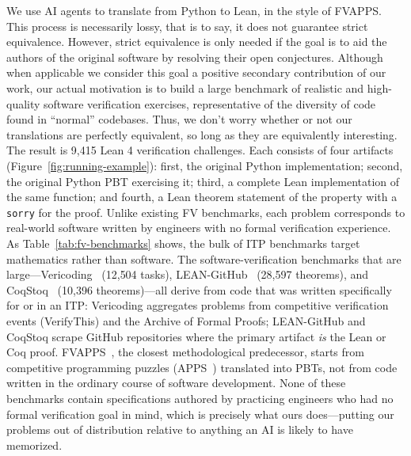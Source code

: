 We use AI agents to translate from Python to Lean, in the style of FVAPPS.
This process is necessarily lossy, that is to say, it does not guarantee strict equivalence.
However, strict equivalence is only needed if the goal is to aid the authors of the original
software by resolving their open conjectures.
Although when applicable we consider this goal a positive secondary contribution of our work,
our actual motivation is to build a large benchmark of realistic and high-quality
software verification exercises, representative of the diversity of code found in 
``normal'' codebases.
Thus, we don't worry whether or not our translations are perfectly equivalent, so long as they are equivalently interesting.
The result is 9{,}415 Lean 4 verification challenges. Each consists of four artifacts (Figure~\ref{fig:running-example}): first, the original Python implementation; second, the original Python PBT exercising it; third, a complete Lean implementation of the same function; and fourth, a Lean theorem statement of the property with a \texttt{sorry} for the proof. Unlike existing FV benchmarks, each problem corresponds to real-world software written by engineers with no formal verification experience. As Table~\ref{tab:fv-benchmarks} shows, the bulk of ITP benchmarks target mathematics rather than software. The software-verification benchmarks that are large---Vericoding~\cite{bursuc2025benchmark} (12{,}504 tasks), LEAN-GitHub~\cite{wu2024lean} (28{,}597 theorems), and CoqStoq~\cite{thompson2024rango} (10{,}396 theorems)---all derive from code that was written specifically for or in an ITP: Vericoding aggregates problems from competitive verification events (VerifyThis) and the Archive of Formal Proofs; LEAN-GitHub and CoqStoq scrape GitHub repositories where the primary artifact \emph{is} the Lean or Coq proof. FVAPPS~\cite{dougherty2025proving}, the closest methodological predecessor, starts from competitive programming puzzles (APPS~\cite{hendrycks2021apps}) translated into PBTs, not from code written in the ordinary course of software development. None of these benchmarks contain specifications authored by practicing engineers who had no formal verification goal in mind, which is precisely what ours does---putting our problems out of distribution relative to anything an AI is likely to have memorized.



